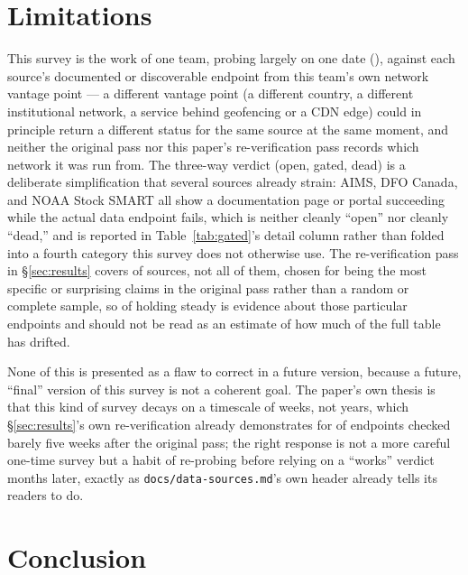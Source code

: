 \section{Limitations}
\label{sec:limitations}

This survey is the work of one team, probing largely on one date
(\ProbeDate{}), against each source's documented or discoverable endpoint
from this team's own network vantage point --- a different vantage point
(a different country, a different institutional network, a service behind
geofencing or a CDN edge) could in principle return a different status for
the same source at the same moment, and neither the original pass nor this
paper's re-verification pass records which network it was run from. The
three-way verdict (open, gated, dead) is a deliberate simplification that
several sources already strain: AIMS, DFO Canada, and NOAA Stock SMART all
show a documentation page or portal succeeding while the actual data
endpoint fails, which is neither cleanly ``open'' nor cleanly ``dead,'' and
is reported in Table~\ref{tab:gated}'s detail column rather than
folded into a fourth category this survey does not otherwise use. The
re-verification pass in \S\ref{sec:results} covers \NEndpointsReprobed{} of
\NSourcesSurveyed{} sources, not all of them, chosen for being the most
specific or surprising claims in the original pass rather than a random or
complete sample, so \NEndpointsUnchanged{} of \NEndpointsReprobed{} holding
steady is evidence about those particular endpoints and should not be read
as an estimate of how much of the full table has drifted.

None of this is presented as a flaw to correct in a future version, because
a future, ``final'' version of this survey is not a coherent goal. The
paper's own thesis is that this kind of survey decays on a timescale of
weeks, not years, which \S\ref{sec:results}'s own re-verification already
demonstrates for \NEndpointsDrifted{} of \NEndpointsReprobed{} endpoints
checked barely five weeks after the original pass; the right response is not
a more careful one-time survey but a habit of re-probing before relying on a
``works'' verdict months later, exactly as \texttt{docs/data-sources.md}'s
own header already tells its readers to do.

\section{Conclusion}

